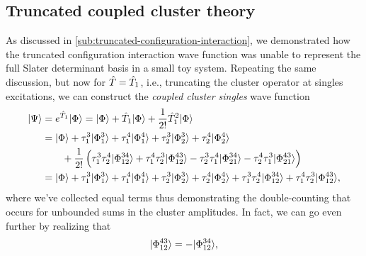         \subsection{Truncated coupled cluster theory}
            As discussed in \autoref{sub:truncated-configuration-interaction},
            we demonstrated how the truncated configuration interaction wave
            function was unable to represent the full Slater determinant basis
            in a small toy system.
            Repeating the same discussion, but now for $\hat{T} = \hat{T}_1$,
            i.e., truncating the cluster operator at singles excitations, we can
            construct the \emph{coupled cluster singles} wave function
            \begin{align}
                | \Psi \rangle &= e^{\hat{T}_1}| \Phi \rangle
                = | \Phi \rangle + \hat{T}_1| \Phi \rangle + \frac{1}{2!}\hat{T}_1^2| \Phi \rangle
                \\
                &= | \Phi \rangle
                + \tau^{3}_{1}| \Phi^{3}_{1} \rangle
                + \tau^{4}_{1}| \Phi^{4}_{1} \rangle
                + \tau^{3}_{2}| \Phi^{3}_{2} \rangle
                + \tau^{4}_{2}| \Phi^{4}_{2} \rangle
                \nonumber \\
                &\qquad
                + \frac{1}{2!}\left( 
                    \tau^{3}_{1}\tau^{4}_{2}| \Phi^{34}_{12} \rangle
                    + \tau^{4}_{1}\tau^{3}_{2}| \Phi^{43}_{12} \rangle
                    - \tau^{3}_{2}\tau^{4}_{1}| \Phi^{34}_{21} \rangle
                    - \tau^{4}_{2}\tau^{3}_{1}| \Phi^{43}_{21} \rangle
                 \right)
                \\
                &= | \Phi \rangle
                + \tau^{3}_{1}| \Phi^{3}_{1} \rangle
                + \tau^{4}_{1}| \Phi^{4}_{1} \rangle
                + \tau^{3}_{2}| \Phi^{3}_{2} \rangle
                + \tau^{4}_{2}| \Phi^{4}_{2} \rangle
                + \tau^{3}_{1}\tau^{4}_{2}| \Phi^{34}_{12} \rangle
                + \tau^{4}_{1}\tau^{3}_{2}| \Phi^{43}_{12} \rangle,
            \end{align}
            where we've collected equal terms thus demonstrating the
            double-counting that occurs for unbounded sums in the cluster
            amplitudes.
            In fact, we can go even further by realizing that
            \begin{align}
                | \Phi^{43}_{12} \rangle = -| \Phi^{34}_{12} \rangle,
            \end{align}
